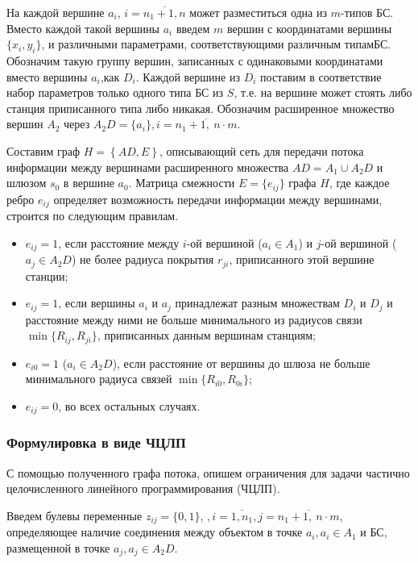На каждой вершине $a_i$, $i= \overline{n_1+1,n}$ может разместиться одна из $m$-типов БС. Вместо каждой такой вершины $a_i$ введем $m$ вершин с координатами вершины $\{x_i, y_i \}$, и различными параметрами, соответствующими различным типамБС. Обозначим такую группу вершин, записанных с одинаковыми координатами вместо вершины $a_i$,как $D_i$. Каждой вершине из $D_i$ поставим в соответствие набор параметров только одного типа БС из $S$, т.е. на вершине может стоять либо станция приписанного типа либо никакая. Обозначим расширенное множество вершин $A_2$ через $A_2D = \{a_i\}, i = \overline{n_1 + 1,\ n \cdot m}$.



Составим граф $H=\left\{AD,E\right\}$, описывающий сеть для передачи потока информации между вершинами расширенного множества $AD=A_1 \cup A_2D$ и шлюзом $s_0$ в вершине $a_0$.
Матрица смежности $E = \{e_{ij} \}$ графа $H$, где каждое ребро $e_{ij}$ определяет возможность передачи информации между вершинами, строится по следующим правилам. 

\begin{itemize}
    \item $e_{ij} = 1$, если расстояние между $i$-ой вершиной ($a_i \in A_1$) и $j$-ой вершиной ($a_j \in A_2D$) не более радиуса покрытия $r_{ji}$, приписанного этой вершине станции;
    \item $e_{ij} = 1$, если вершины $a_i$ и $a_j$ принадлежат разным множествам $D_i$ и $D_j$ и расстояние между ними не больше минимального из радиусов связи $\min\{R_{ij}, R_{ji}\}$, приписанных данным вершинам станциям;
    \item $e_{i0} = 1$ ($a_i \in A_2D$), если расстояние от вершины до шлюза не больше минимального радиуса связей $\min\{R_{i0}, R_{0i}\}$;
    \item $e_{ij} = 0$, во всех остальных случаях.
\end{itemize}

\subsubsection{Формулировка в виде ЧЦЛП}

С помощью полученного графа потока, опишем ограничения для задачи частично целочисленного линейного программирования (ЧЦЛП).

Введем булевы переменные $z_{ij} = \{0, 1\}$, $, i = \overline{1,n_1}, j = \overline{n_1+1, \ n \cdot m}$, определяющее наличие соединения между объектом в точке $a_i, a_i \in A_1$  и БС, размещенной в точке $a_j, a_j \in A_2D$.


